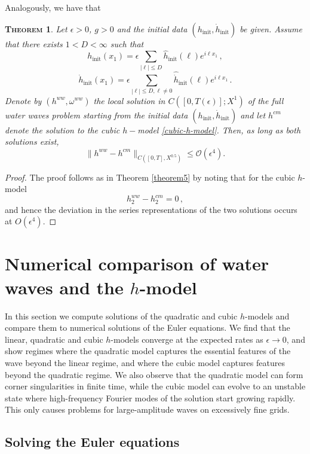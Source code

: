 \documentclass[11pt]{article}
\theoremstyle{plain}
\newtheorem{theorem}{\scshape Theorem}
\theoremstyle{definition}
\theoremstyle{definition}
\newcommand{\eps}{\epsilon}
\def\hinit{h_{\operatorname{init}}}
\def\fhinit{\widehat{{ h}}_{\operatorname{init}}}
\def\htinit{{\dot h}_{\operatorname{init}}}
\def\fhtinit{\widehat{{\dot h}}_{\operatorname{init}}}
\begin{document}
Analogously, we have that
\begin{theorem}\label{theorem6} Let $\epsilon>0$, $g > 0$ and the initial data $(\hinit, \htinit)$ be given. Assume that there exists $1<D<\infty$ such that
$$
\hinit(x_1)=\epsilon\sum_{|\ell|\leq D}\fhinit(\ell)e^{i\ell x_1}\,,
$$
$$
\htinit(x_1)=\epsilon\sum_{|\ell|\leq D,\ell\neq0}\fhtinit(\ell)e^{i\ell x_1}\,.
$$
Denote by $(h^{ww},\omega^{ww})$ the local solution in $C([0,T(\epsilon)];X^1)$ of the full water waves problem starting from the initial data $(\hinit, \htinit)$ and 
let $h^{cm}$ denote the solution to the cubic $h-$model \eqref{cubic-h-model}. Then, as long as both solutions exist, 
$$
\|h^{ww}-h^{cm}\|_{C([0,T],X^{0.5})}\leq \mathcal{O}(\epsilon^{4}).
$$
\end{theorem}
\begin{proof}
The proof follows  as in Theorem \ref{theorem5} by noting that for the cubic $h$-model
$$
h_2^{ww}-h_2^{cm}=0\,,
$$
and hence the deviation in the series representations of the two solutions occurs at $O( \epsilon ^4)$.
\end{proof}


\section{Numerical comparison of water waves and the $h$-model}\label{sec:numerics}

In this section we compute solutions of the quadratic and cubic
$h$-models and compare them to numerical solutions of the Euler
equations. We find that the linear, quadratic and cubic $h$-models
converge at the expected rates as $\eps\rightarrow0$, and show
regimes where the quadratic model captures the essential features of
the wave beyond the linear regime, and where the cubic model captures
features beyond the quadratic regime. We also observe that the
quadratic model can form corner singularities in finite time, while
the cubic model can evolve to an unstable state where high-frequency
Fourier modes of the solution start growing rapidly. This only causes
problems for large-amplitude waves on excessively fine grids.


\subsection{Solving the Euler equations}
\end{document}
